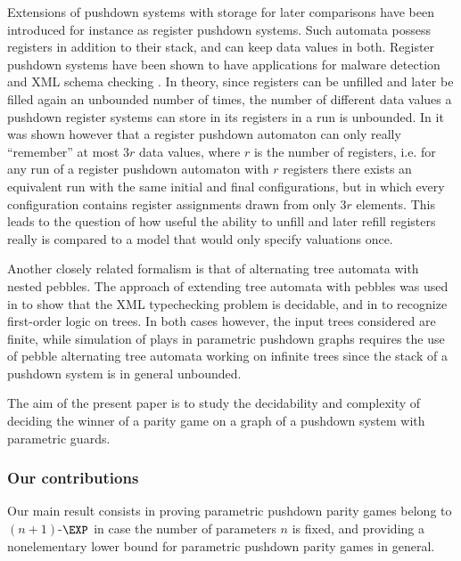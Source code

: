 \documentclass[a4paper,UKenglish,cleveref, autoref, thm-restate]{lipics-v2021}
\begin{document}
Extensions of pushdown systems with storage for later comparisons
have been introduced for instance as register pushdown systems. 
Such automata possess registers in addition to their stack, and can keep data values in both.
Register pushdown systems have been shown to have applications for malware detection and XML schema checking \cite{senda2021forward, senda2021ltl}. 
In theory, since registers can be unfilled and later be filled again an unbounded number of times, the number of different data values a pushdown register systems can store in its registers in a run is unbounded.  
In \cite{murawski2017reachability} it was shown however that a register pushdown automaton can
only really ``remember'' at most  $3r$ data values, where $r$ is the number of registers,
i.e. for any run of a register pushdown automaton with $r$ registers there exists an equivalent run 
 with the same initial and final conﬁgurations, but in which every configuration contains register assignments drawn from only $3r$ elements. This  
 leads to
 the
  question
  of
   how useful the ability to unfill and later refill registers really is compared to a model that would only specify valuations once.






Another closely related formalism is that of alternating tree automata with nested pebbles. The approach of extending tree automata with pebbles was used in \cite{milo2000typechecking} to show that the XML typechecking problem is decidable, and in \cite{karhumaki2012jewels} to recognize first-order logic on trees. In both cases however, the input trees considered are finite, while 
simulation of plays in parametric pushdown graphs
requires the use of pebble alternating tree automata working on infinite trees
since the stack of a pushdown system is in general unbounded.



The aim of the present paper is to study the decidability and complexity of
deciding
the winner of a parity game on a graph of a pushdown system with  
parametric guards.


 

\subsubsection*{Our contributions}


Our main result consists in
proving parametric pushdown parity games belong to $(n+1)$-$\EXP$ in case the number of parameters
$n$ is fixed,
and providing a nonelementary lower bound for parametric pushdown parity games in general.
\end{document}
